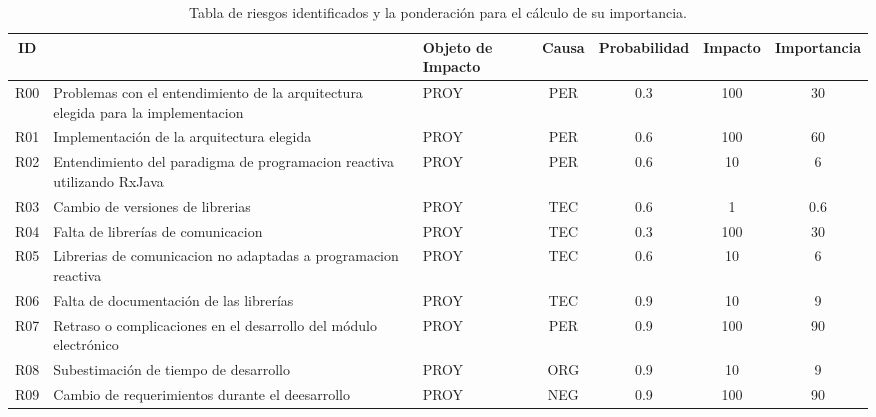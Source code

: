 \begin{table}[ht]
	\begin{tabular}{|c|>{\small}m{3cm}|m{5em}|c|c|c|c|}
		\hline
		\textbf{ID} & \multicolumn{1}{c|}{\textbf{Descripción}} & \textbf{\small{Objeto de Impacto}} & \textbf{Causa} & \textbf{Probabilidad} & \textbf{Impacto} & \textbf{Importancia} \\ \hline
		R00         & Problemas con el entendimiento de la arquitectura elegida para la implementacion & PROY                       & PER            & 0.3                   & 100              & 30                   \\ \hline
		R01         & Implementación de la arquitectura elegida                                        & PROY                       & PER            & 0.6                   & 100              & 60                   \\ \hline
		R02         & Entendimiento del paradigma de programacion reactiva utilizando RxJava           & PROY                       & PER            & 0.6                   & 10               & 6                    \\ \hline
		R03         & Cambio de versiones de librerias                                                 & PROY                       & TEC            & 0.6                   & 1                & 0.6                  \\ \hline
		R04         & Falta de librerías de comunicacion                                               & PROY                       & TEC            & 0.3                   & 100              & 30                   \\ \hline
		R05         & Librerias de comunicacion no adaptadas a programacion reactiva                   & PROY                       & TEC            & 0.6                   & 10               & 6                    \\ \hline
		R06         & Falta de documentación de las librerías                                          & PROY                       & TEC            & 0.9                   & 10               & 9                    \\ \hline
		R07         & Retraso o complicaciones en el desarrollo del módulo electrónico                 & PROY                       & PER            & 0.9                   & 100              & 90                   \\ \hline
		R08         & Subestimación de tiempo de desarrollo                                            & PROY                       & ORG            & 0.9                   & 10               & 9                    \\ \hline
		R09         & Cambio de requerimientos durante el deesarrollo                                  & PROY                       & NEG            & 0.9                   & 100              & 90                   \\ \hline
	\end{tabular}
	\caption[Riesgos Identificados]{Tabla de riesgos identificados y la ponderación para el cálculo de su importancia.}
	\label{table:riegos_identificados}
\end{table}


